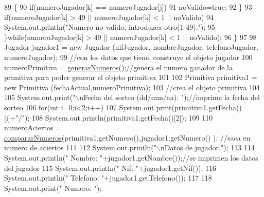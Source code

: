 \begin{DoxyCode}
89                     \{
90                         \textcolor{keywordflow}{if}(numeroJugador[k] == numeroJugador[j])
91                             noValido=\textcolor{keyword}{true};
92                     \}
93                     \textcolor{keywordflow}{if}(numeroJugador[k] > 49 || numeroJugador[k] < 1 || noValido)
94                      System.out.println(\textcolor{stringliteral}{"Numero no valido, introduzca otro(1-49)."});
95                     \}\textcolor{keywordflow}{while}(numeroJugador[k] > 49 || numeroJugador[k] < 1 || noValido);
96         \}
97                 
98                 Jugador jugador1 = \textcolor{keyword}{new} Jugador (nifJugador, nombreJugador, telefonoJugador, numeroJugador);
99                 \textcolor{comment}{//con los datos que tiene, construye el objeto jugador}
100                 numeroPrimitiva = \mbox{\hyperlink{classtrabajoignacioriberagii_1_1_trabajo_ignacio_ribera_g_i_i_a3ebb16ff889f09eecc47a959b7f33a54}{generarNumeros}}();\textcolor{comment}{//genera el numero ganador de la primitiva
       para poder generar el objeto primitiva}
101                 
102                 Primitiva primitiva1 = \textcolor{keyword}{new} Primitiva (fechaActual,numeroPrimitiva);
103                 \textcolor{comment}{//crea el objeto primitiva}
104                 
105                 System.out.print(\textcolor{stringliteral}{"\(\backslash\)nFecha del sorteo (dd/mm/aa): "});\textcolor{comment}{//imprime la fecha del sorteo}
106                 \textcolor{keywordflow}{for}(\textcolor{keywordtype}{int} i=0;i<2;i++)
107                     System.out.print(primitiva1.getFecha()[i]+\textcolor{stringliteral}{"/"});
108                     System.out.println(primitiva1.getFecha()[2]);
109                     
110                 numeroAciertos = \mbox{\hyperlink{classtrabajoignacioriberagii_1_1_trabajo_ignacio_ribera_g_i_i_afd0cbbbade0a2b770ea10a9fc69c0608}{compararNumeros}}(primitiva1.getNumero(),jugador1.getNumero()
      );    \textcolor{comment}{//saca en numero de aciertos}
111                 
112                 System.out.println(\textcolor{stringliteral}{"\(\backslash\)nDatos de jugador."});
113                 
114                 System.out.println(\textcolor{stringliteral}{"    Nombre: "}+jugador1.getNombre());\textcolor{comment}{//se imprimen los datos del jugador}
115                 System.out.println(\textcolor{stringliteral}{"    Nif: "}+jugador1.getNif());
116                 System.out.println(\textcolor{stringliteral}{"    Telefono: "}+jugador1.getTelefono());
117                 
118                 System.out.print(\textcolor{stringliteral}{"  Numero: "});

\end{DoxyCode}
